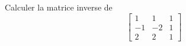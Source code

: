 Calculer la matrice inverse de
  \[
  \left[
  \begin{array}{ccc}
	  1 & 1 & 1 \\
	  -1 & -2 & 1 \\
	  2 & 2 & 1
  \end{array}
  \right]
  \] 
  \bigskip \bigskip \bigskip \bigskip \bigskip